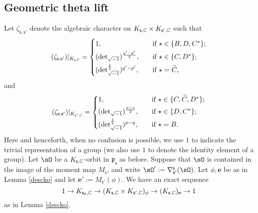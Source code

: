 \documentclass[12pt,a4paper]{amsart}
\newcommand{\p}{\mathfrak p}
\numberwithin{equation}{section}
\theoremstyle{remark}
\begin{document}
\subsection{Geometric theta lift}
Let $\zeta_{\mathsf s, \mathsf s'}$ denote the algebraic character on $K_{\mathsf s, \mathbb{C}}\times K_{\mathsf s', \mathbb{C}}$  such that
\[
 (\zeta_{\mathsf s, \mathsf s'})|_{K_{\mathsf s, \C}}=
   \begin{cases}
    1, \quad & \textrm{if $\star\in \{B, D, C^*\}$}; \smallskip\\
      ({\det}_{\sqrt{-1}})^{\frac{q'-p'}{2}}, \quad & \textrm{if $\star\in \{C, D^*\}$};\smallskip\\
     ({\det}_{\sqrt{-1}}^{\frac{1}{2}})^{q'-p'}, \quad & \textrm{if $\star=\widetilde C$,}\\
  \end{cases}
\]
and
\[
 (\zeta_{\mathsf s, \mathsf s'})|_{K_{\mathsf s', \C}}=
   \begin{cases}
    1, \quad & \textrm{if $\star\in \{C, \widetilde C, D^*\}$}; \smallskip\\
      ({\det}_{\sqrt{-1}})^{\frac{p-q}{2}}, \quad & \textrm{if $\star\in \{D, C^*\}$};\smallskip\\
     ({\det}_{\sqrt{-1}}^{\frac{1}{2}})^{p-q}, \quad & \textrm{if $\star=B$}.
 \end{cases}
\]
Here and henceforth, when no confusion is possible, we  use $1$ to indicate the trivial representation of a group (we also use $1$ to denote the identity element of a group). 
Let  $\sO$ be a $K_{\mathsf s, \mathbb{C}}$-orbit in $\p_{\mathsf s}$ as before. Suppose that $\sO$ is contained in the image of the moment map $M_{\mathsf s}$, and write $\sO':=\nabla^{\mathsf s}_{\mathsf s'}(\sO)$.
Let $\phi,\mathbf e$ be as in Lemma  \ref{descko} and let $\mathbf e':=M_{\mathsf s'}(\phi)$. We have an exact sequence
\[
  1\rightarrow K_{\mathsf s_0,\mathbb{C}}\rightarrow (K_{\mathsf s,\mathbb{C}}\times K_{\mathsf s', \mathbb{C}})_\phi\rightarrow (K_{\mathsf s,\mathbb{C}})_{\mathbf e}\rightarrow 1
\]
as in Lemma  \ref{descko}.
\end{document}
